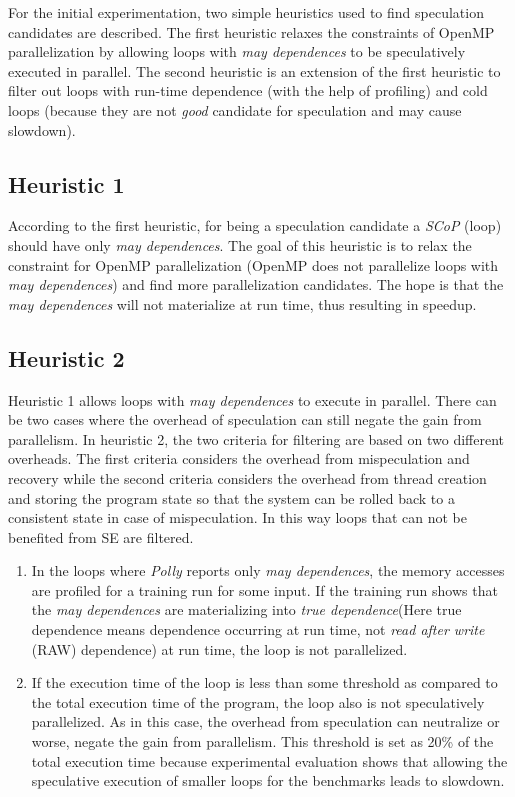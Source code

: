 \documentclass[10pt]{report}          %
\begin{document}
For the initial experimentation, two simple heuristics used to find speculation candidates are described.  The first heuristic relaxes the constraints of OpenMP parallelization by allowing loops with \textit{may dependences} to be speculatively executed in parallel.  The second heuristic is an extension of the first heuristic to filter out loops with run-time dependence (with the help of profiling) and cold loops (because they are not \textit{good} candidate for speculation and may cause slowdown).

\subsection{Heuristic 1}

According to the first heuristic,  for being a speculation candidate a \textit{SCoP} (loop) should have only \textit{may dependences}. The goal of this heuristic is to relax the constraint for OpenMP parallelization (OpenMP does not parallelize loops with \textit{may dependences}) and find more parallelization candidates.  The hope is that the \textit{may dependences} will not materialize at run time, thus resulting in speedup. 
 
\subsection{Heuristic 2}

Heuristic 1 allows loops with \textit{may dependences} to execute in parallel.  There can be two cases where the overhead of speculation can still negate the gain from parallelism. In heuristic 2, the two criteria for filtering are based on two different overheads. The first criteria considers the overhead from mispeculation and recovery while the second criteria considers the overhead from thread creation and storing the program state so that the system can be rolled back to a consistent state in case of mispeculation.  In this way loops that can not be benefited from SE are filtered. 

\begin{enumerate}
\item In the loops where \textit{Polly} reports only \textit{may dependences}, the memory accesses are profiled for a training run for some input.  If the training run shows that the \textit{may dependences} are materializing into \textit{true dependence}(Here true dependence means dependence occurring at run time, not \textit{read after write} (RAW) dependence) at run time, the loop is not parallelized.
\item If the execution time of the loop is less than some threshold as compared to the total execution time of the program, the loop also is not speculatively parallelized.  As in this case, the overhead from speculation can neutralize or worse, negate the gain from parallelism. This threshold is set as 20\% of the total execution time because experimental evaluation shows that allowing  the speculative execution of smaller loops for the benchmarks leads to slowdown. 
\end{enumerate}
\end{document}

